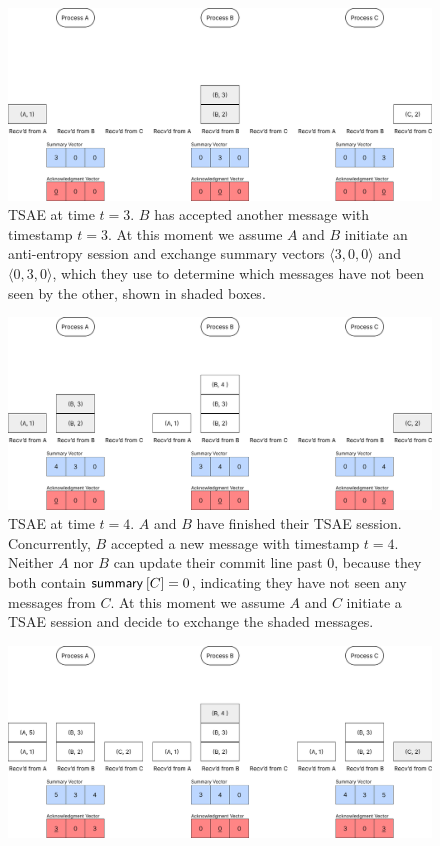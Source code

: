 \documentclass[]             %
{NASA}                       %
\theoremstyle{definition}
\begin{document}
\begin{landscape}
\begin{figure}[h]
    \label{fig:tsae2}
  \end{figure}
  \begin{figure}[h]
    \centering
    \includegraphics[width=1.4\textwidth]{images/tsae/TSAE3.png}
    \caption{TSAE at time $t=3$. $B$ has accepted another message with timestamp $t = 3$. At this moment we assume $A$ and $B$ initiate an anti-entropy session and exchange summary vectors $\langle 3,0,0\rangle$ and $\langle 0,3,0 \rangle$, which they use to determine which messages have not been seen by the other, shown in shaded boxes.}
    \label{fig:tsae3}
  \end{figure}
  \begin{figure}[h]
    \centering
    \includegraphics[width=1.4\textwidth]{images/tsae/TSAE4.png}
    \caption{TSAE at time $t=4$. $A$ and $B$ have finished their TSAE session. Concurrently, $B$ accepted a new message with timestamp $t=4$. Neither $A$ nor $B$ can update their commit line past $0$, because they both contain $\textsf{summary}^{}\left[C\right] = 0$, indicating they have not seen any messages from $C$. At this moment we assume $A$ and $C$ initiate a TSAE session and decide to exchange the shaded messages.}
    \label{fig:tsae4}
  \end{figure}
  \begin{figure}[h]
    \centering
    \includegraphics[width=1.4\textwidth]{images/tsae/TSAE5.png}

\end{figure}
\end{landscape}
\end{document}
